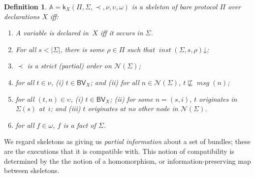 \documentclass[12pt]{article}
\newcommand{\fn}[1]{\ensuremath{\operatorname{\mathit{#1}}}}
\newcommand{\defd}{\mathord\downarrow}
\newcommand{\skel}{\mathbb{A}}
\newcommand{\skl}{\mathsf{k}}
\newcommand{\nodes}{\ensuremath{\mathcal{N}}}
\newcommand{\length}[1]{\ensuremath{|#1|}}
\newcommand{\alg}[1]{\ensuremath{\mathsf{#1}}}
\newcommand{\atm}{\alg{BV}}
\newcommand{\ssp}{\Sigma}
\newcommand{\mess}{\fn{msg}}
\newtheorem{definition}{Definition}
\begin{document}
\begin{definition}\label{def:skeleton}
  $\skel=\skl_X(\Pi,\ssp,\prec,\nu,\upsilon,\omega)$ is a
  \emph{skeleton of} bare protocol $\Pi$ over declarations $X$ iff:
%
  \begin{enumerate}
    \item A variable is declared in~$X$ iff it occurs in $\ssp$.
    \item For all $s<\length{\ssp}$, there is some $\rho\in\Pi$ such
      that $\fn{inst}(\ssp,s,\rho)\defd$;
    \item $\prec$ is a strict (partial) order on $\nodes(\ssp)$;
    \item for all $t\in\nu$, (i) $t\in\atm_X$; and (ii) for all
    $n\in\nodes(\ssp)$, $t\not\sqsubseteq\mess(n)$;
    \item for all $(t,n)\in\upsilon$, (i) $t\in\atm_X$; (ii) for some
      $n=(s,i)$, $t$ originates in $\ssp(s)$ at~$i$; and (iii) $t$
      originates at no other node in $\nodes(\ssp)$.
    \item for all $f\in\omega$, $f$ is a fact of $\ssp$.
  \end{enumerate}
%
\end{definition}

We regard skeletons as giving us \emph{partial information} about a
set of bundles; these are the executions that it is compatible with.
This notion of compatibility is determined by the the notion of a
homomorphism, or information-preserving map between skeletons.
\end{document}
